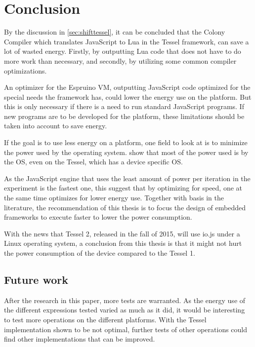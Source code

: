 \chapter{Conclusion}
\label{chap:chapter6}

By the discussion in \cref{sec:shifttessel}, it can be concluded that the Colony Compiler which translates JavaScript to Lua in the Tessel framework, can save a lot of wasted energy.
Firstly, by outputting Lua code that does not have to do more work than necessary, and secondly, by utilizing some common compiler optimizations.

An optimizer for the Espruino VM, outputting JavaScript code optimized for the special needs the framework has, could lower the energy use on the platform.
But this is only necessary if there is a need to run standard JavaScript programs.
If new programs are to be developed for the platform, these limitations should be taken into account to save energy.

If the goal is to use less energy on a platform, one field to look at is to minimize the power used by the operating system.
 show that most of the power used is by the OS, even on the Tessel, which has a device specific OS.

As the JavaScript engine that uses the least amount of power per iteration in the experiment is the fastest one, this suggest that by optimizing for speed, one at the same time optimizes for lower energy use.
Together with basis in the literature, the recommendation of this thesis is to focus the design of embedded frameworks to execute faster to lower the power consumption.

With the news that Tessel 2, released in the fall of 2015, will use io.js under a Linux operating system, a conclusion from this thesis is that it might not hurt the power consumption of the device compared to the Tessel 1.


\section{Future work}
After the research in this paper, more tests are warranted.
As the energy use of the different expressions tested varied as much as it did, it would be interesting to test more operations on the different platforms.
With the Tessel implementation shown to be not optimal, further tests of other operations could find other implementations that can be improved.

